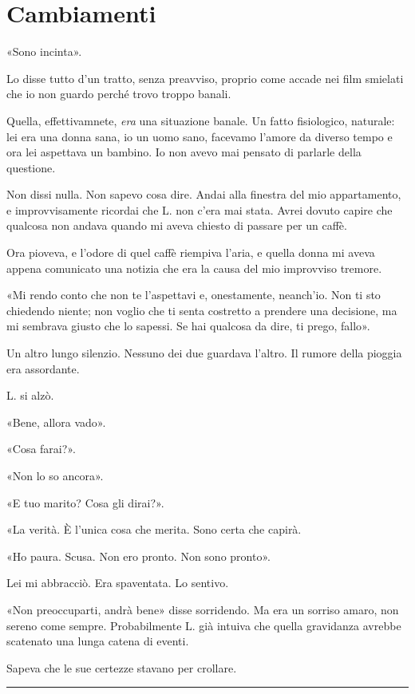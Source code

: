 \chapter{Cambiamenti}
\label{ch:cambiamenti}

«Sono incinta».

Lo disse tutto d'un tratto, senza preavviso, proprio come accade nei film smielati che io non guardo
perché trovo troppo banali.

Quella, effettivamnete, \emph{era} una situazione banale. Un fatto fisiologico, naturale: lei era
una donna sana, io un uomo sano, facevamo l'amore da diverso tempo e ora lei aspettava un bambino.
Io non avevo mai pensato di parlarle della questione.

Non dissi nulla. Non sapevo cosa dire. Andai alla finestra del mio appartamento, e improvvisamente
ricordai che L. non c'era mai stata. Avrei dovuto capire che qualcosa non andava quando mi aveva
chiesto di passare per un caffè.

Ora pioveva, e l'odore di quel caffè riempiva l'aria, e quella donna mi aveva appena comunicato una
notizia che era la causa del mio improvviso tremore.

«Mi rendo conto che non te l'aspettavi e, onestamente, neanch'io. Non ti sto chiedendo niente; non
voglio che ti senta costretto a prendere una decisione, ma mi sembrava giusto che lo sapessi. Se hai
qualcosa da dire, ti prego, fallo».

Un altro lungo silenzio. Nessuno dei due guardava l'altro. Il rumore della pioggia era assordante.

L. si alzò.

«Bene, allora vado».

«Cosa farai?».

«Non lo so ancora».

«E tuo marito? Cosa gli dirai?».

«La verità. È l'unica cosa che merita. Sono certa che capirà.

«Ho paura. Scusa. Non ero pronto. Non sono pronto».

Lei mi abbracciò. Era spaventata. Lo sentivo.

«Non preoccuparti, andrà bene» disse sorridendo. Ma era un sorriso amaro, non sereno come sempre.
Probabilmente L. già intuiva che quella gravidanza avrebbe scatenato una lunga catena di eventi.

Sapeva che le sue certezze stavano per crollare.

\plainbreak{1}

